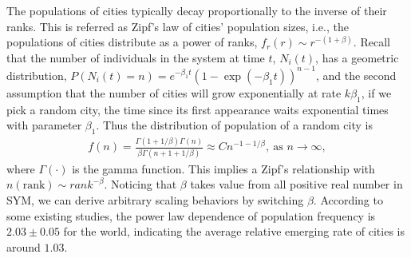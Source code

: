 \documentclass[reprint,unsortedaddress,amsmath,amssymb,aps,prl,showkeys]{revtex4-2}
\begin{document}
The populations of cities typically decay proportionally to the inverse of their ranks\cite{gabaix1999zipf's}. This is referred as Zipf's law of cities' population sizes, i.e., the populations of cities distribute as a power of ranks, $f_r(r)\sim r^{-(1+\beta)}$. Recall that the number of individuals in the system at time $t$, $N_i(t)$, has a geometric distribution\cite{durrett1999essentials}, $P(N_i(t)=n)=e^{-\beta_1t}(1-\exp(- {\beta_1} t))^{n-1}$, and the second assumption that the number of cities will grow exponentially at rate $k\beta_1$, if we pick a random city, the time since its first appearance waits exponential times with parameter $\beta_1$. Thus the distribution of population of a random city is 
\begin{align}
	f(n)=\frac{\Gamma(1+1/\beta)\Gamma(n)}{\beta\Gamma(n+1+1/\beta)}\approx Cn^{-1-1/\beta}, \ \text{as } n\to\infty,
\end{align}
where $\Gamma(\cdot)$ is the gamma function. This implies a Zipf's relationship with $n(\text{rank})\sim {rank}^{-\beta}$. Noticing that $\beta$ takes value from all positive real number in SYM, we can derive arbitrary scaling behaviors by switching $\beta$. According to some existing studies\cite{PhysRevLett.79.523}, the power law dependence of population frequency is $2.03\pm 0.05$ for the world, indicating the average relative emerging rate of cities is around $1.03$. 
\end{document}
